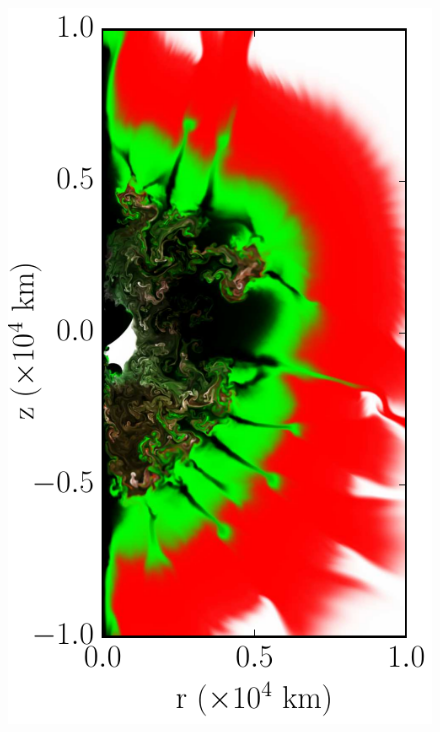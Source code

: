 \documentclass[iop,apj]{emulateapj}
\begin{document}
\begin{figure}[!ht]
\begin{minipage}{0.24\textwidth}
    \includegraphics[width=\linewidth]{"figures/flash_simulations/delayed-core/mpole-16_amp-12/cone_400k_m16_a12_0200"}
  \end{minipage} \hfill 
  \begin{minipage}{0.24\textwidth}

\end{minipage}
\end{figure}
\end{document}
